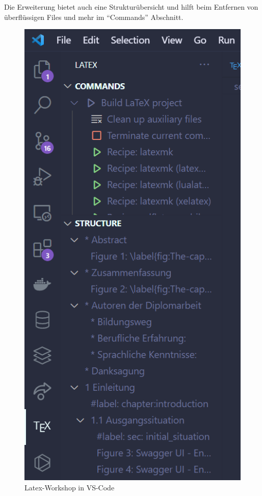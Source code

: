 Die Erweiterung bietet auch eine Strukturübersicht und hilft beim Entfernen von überflüssigen Files und mehr im ``Commands'' Abschnitt.

\begin{figure}[ht!]
  \centering
  \includegraphics[scale=.8]{pics/latex-workshop-vs-code.PNG}
  \caption{\label{fig:The-caption}Latex-Workshop in VS-Code }
  \label{fig:impl:use-case-diagramm}
\end{figure}

